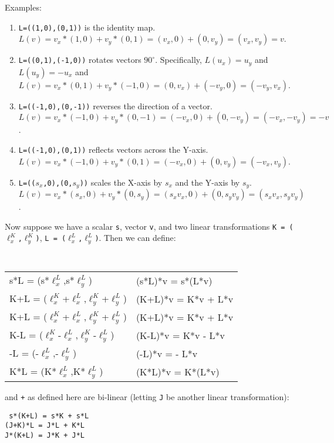 \documentclass[12pt]{article}
\begin{document}
Examples:
\begin{enumerate}
\item {\tt L=((1,0),(0,1))} is the identity map.
$L(v)=v_x*(1,0) + v_y*(0,1) = (v_x,0)+(0,v_y) = (v_x,v_y) = v$.
\item {\tt L=((0,1),(-1,0))} rotates vectors $90^\circ$.
Specifically, $L(u_x)=u_y$ and $L(u_y)=-u_x$ and
$L(v)=v_x*(0,1) + v_y*(-1,0) = (0,v_x)+(-v_y,0) = (-v_y,v_x)$.
\item {\tt L=((-1,0),(0,-1))} reverses the direction of a vector.
$L(v)=v_x*(-1,0) + v_y*(0,-1) = (-v_x,0)+(0,-v_y) = (-v_x,-v_y) = -v$.
\item {\tt L=((-1,0),(0,1))} reflects vectors across the Y-axis.
$L(v)=v_x*(-1,0) + v_y*(0,1) = (-v_x,0)+(0,v_y) = (-v_x,v_y)$.
\item {\tt L=(($s_x$,0),(0,$s_y$))} scales the X-axis by $s_x$ and
the Y-axis by $s_y$. \\
$L(v)=v_x*(s_x,0) + v_y*(0,s_y)
     = (s_x v_x,0)+(0,s_y v_y)= (s_x v_x, s_y v_y)$.
\end{enumerate}

Now suppose we have a scalar {\tt s}, vector {\tt v},
and two linear transformations
{\tt K = ($\ell^K_x$,$\ell^K_y$)},
{\tt L = ($\ell^L_x$,$\ell^L_y$)}.  Then we can define:
\begin{center}
\tt
\begin{tabular}{l@{~so that~}l}
s*L = (s*$\ell^L_x$,s*$\ell^L_y$)
	 & (s*L)*v = s*(L*v) \\[0.3ex]
K+L = ($\ell^K_x$+$\ell^L_x$,$\ell^K_y$+$\ell^L_y$)
	 & (K+L)*v = K*v + L*v \\[0.3ex]
K+L = ($\ell^K_x$+$\ell^L_x$,$\ell^K_y$+$\ell^L_y$)
	 & (K+L)*v = K*v + L*v \\[0.3ex]
K-L = ($\ell^K_x$-$\ell^L_x$,$\ell^K_y$-$\ell^L_y$)
	 & (K-L)*v = K*v - L*v \\[0.3ex]
-L = (-$\ell^L_x$,-$\ell^L_y$)
	 & (-L)*v = - L*v \\[0.3ex]
K*L = (K*$\ell^L_x$,K*$\ell^L_y$)
	 & (K*L)*v = K*(L*v)
\end{tabular}
\end{center}

{\tt *} and {\tt +} as defined here are bi-linear
(letting {\tt J} be another linear transformation):
\begin{center}
\tt
s*(K+L) = s*K + s*L \\
(J+K)*L = J*L + K*L \\
J*(K+L) = J*K + J*L
\end{center}
\end{document}
